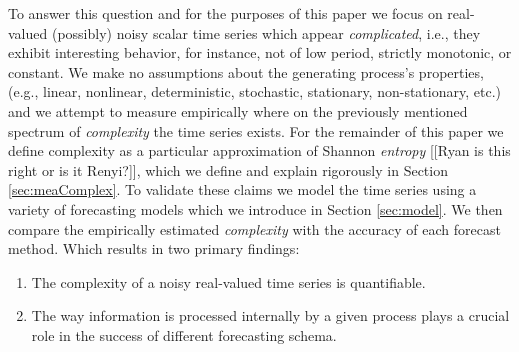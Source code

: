 To answer this question and for the purposes of this paper we focus on real-valued (possibly) noisy scalar time series which appear \emph{complicated}, i.e., they exhibit interesting behavior, for instance, not of low period, strictly monotonic, or constant. We make no assumptions about the generating process's properties,(e.g., linear, nonlinear, deterministic, stochastic, stationary, non-stationary, etc.) and we attempt to measure empirically where on the previously mentioned spectrum of \emph{complexity} the time series exists. For the remainder of this paper we define complexity as a particular approximation of Shannon \emph{entropy} [[Ryan is this right or is it Renyi?]], which we define and explain rigorously in Section \ref{sec:meaComplex}.  To validate these claims we model the time series using a variety of forecasting models which we introduce in Section \ref{sec:model}. We then compare the empirically estimated \emph{complexity} with the accuracy of each forecast method. Which results in two primary findings:


\begin{enumerate}

\item The complexity of a noisy real-valued time series is quantifiable.

\item The way information is processed internally by a given process plays a crucial role in the success of different forecasting schema.

\end{enumerate}







